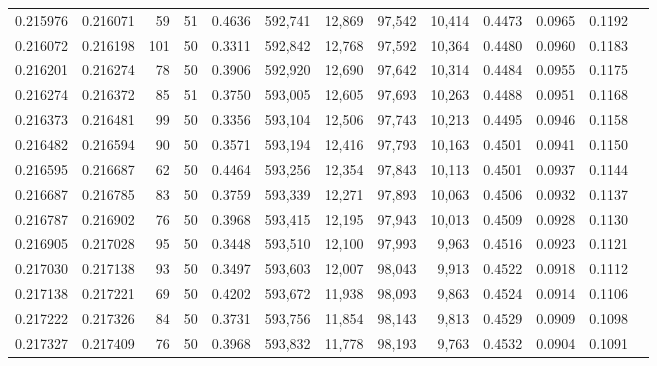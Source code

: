 \begin{tabular}{rrrrrrrrrrrrr}
0.215976 & 0.216071 &    59 &  51 &                                     0.4636 & 592,741 &  12,869 &  97,542 &  10,414 & 0.4473 & 0.0965 & 0.1192 \\
0.216072 & 0.216198 &   101 &  50 &                                     0.3311 & 592,842 &  12,768 &  97,592 &  10,364 & 0.4480 & 0.0960 & 0.1183 \\
0.216201 & 0.216274 &    78 &  50 &                                     0.3906 & 592,920 &  12,690 &  97,642 &  10,314 & 0.4484 & 0.0955 & 0.1175 \\
0.216274 & 0.216372 &    85 &  51 &                                     0.3750 & 593,005 &  12,605 &  97,693 &  10,263 & 0.4488 & 0.0951 & 0.1168 \\
0.216373 & 0.216481 &    99 &  50 &                                     0.3356 & 593,104 &  12,506 &  97,743 &  10,213 & 0.4495 & 0.0946 & 0.1158 \\
0.216482 & 0.216594 &    90 &  50 &                                     0.3571 & 593,194 &  12,416 &  97,793 &  10,163 & 0.4501 & 0.0941 & 0.1150 \\
0.216595 & 0.216687 &    62 &  50 &                                     0.4464 & 593,256 &  12,354 &  97,843 &  10,113 & 0.4501 & 0.0937 & 0.1144 \\
0.216687 & 0.216785 &    83 &  50 &                                     0.3759 & 593,339 &  12,271 &  97,893 &  10,063 & 0.4506 & 0.0932 & 0.1137 \\
0.216787 & 0.216902 &    76 &  50 &                                     0.3968 & 593,415 &  12,195 &  97,943 &  10,013 & 0.4509 & 0.0928 & 0.1130 \\
0.216905 & 0.217028 &    95 &  50 &                                     0.3448 & 593,510 &  12,100 &  97,993 &   9,963 & 0.4516 & 0.0923 & 0.1121 \\
0.217030 & 0.217138 &    93 &  50 &                                     0.3497 & 593,603 &  12,007 &  98,043 &   9,913 & 0.4522 & 0.0918 & 0.1112 \\
0.217138 & 0.217221 &    69 &  50 &                                     0.4202 & 593,672 &  11,938 &  98,093 &   9,863 & 0.4524 & 0.0914 & 0.1106 \\
0.217222 & 0.217326 &    84 &  50 &                                     0.3731 & 593,756 &  11,854 &  98,143 &   9,813 & 0.4529 & 0.0909 & 0.1098 \\
0.217327 & 0.217409 &    76 &  50 &                                     0.3968 & 593,832 &  11,778 &  98,193 &   9,763 & 0.4532 & 0.0904 & 0.1091 \\

\end{tabular}
